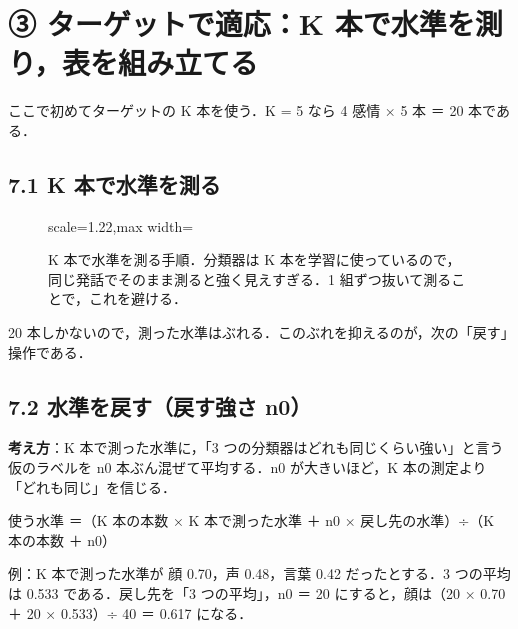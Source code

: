 \documentclass[a4paper,11pt]{ltjsarticle}
\begin{document}
\section{③ ターゲットで適応：K 本で水準を測り，表を組み立てる}

ここで初めてターゲットの K 本を使う．K = 5 なら 4 感情 × 5 本 ＝ 20 本である．

\subsection*{7.1 K 本で水準を測る}

\begin{figure}[H]
\centering
\begin{adjustbox}{scale=1.22,max width=\linewidth}\end{adjustbox}
\caption{K 本で水準を測る手順．分類器は K 本を学習に使っているので，同じ発話でそのまま測ると強く見えすぎる．1 組ずつ抜いて測ることで，これを避ける．}
\end{figure}

20 本しかないので，測った水準はぶれる．このぶれを抑えるのが，次の「戻す」操作である．

\subsection*{7.2 水準を戻す（戻す強さ n0）}

\textbf{考え方}：K 本で測った水準に，「3 つの分類器はどれも同じくらい強い」と言う仮のラベルを n0 本ぶん混ぜて平均する．n0 が大きいほど，K 本の測定より「どれも同じ」を信じる．
\begin{center}
\small
使う水準 ＝（K 本の本数 × K 本で測った水準 ＋ n0 × 戻し先の水準）÷（K 本の本数 ＋ n0）
\end{center}
例：K 本で測った水準が 顔 0.70，声 0.48，言葉 0.42 だったとする．3 つの平均は 0.533 である．戻し先を「3 つの平均」，n0 ＝ 20 にすると，顔は（20 × 0.70 ＋ 20 × 0.533）÷ 40 ＝ 0.617 になる．
\end{document}

